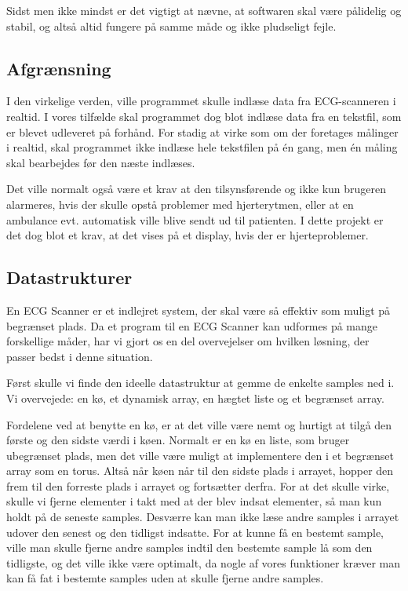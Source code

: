 \documentclass{article}
\begin{document}
Sidst men ikke mindst er det vigtigt at nævne, at softwaren skal være pålidelig og stabil, og altså altid fungere på samme måde og ikke pludseligt fejle.

\subsection{Afgrænsning}
I den virkelige verden, ville programmet skulle indlæse data fra ECG-scanneren i realtid. I vores tilfælde skal programmet dog blot indlæse data fra en tekstfil, som er blevet udleveret på forhånd. For stadig at virke som om der foretages målinger i realtid, skal programmet ikke indlæse hele tekstfilen på én gang, men én måling skal bearbejdes før den næste indlæses.

Det ville normalt også være et krav at den tilsynsførende og ikke kun brugeren alarmeres, hvis der skulle opstå problemer med hjerterytmen, eller at en ambulance evt. automatisk ville blive sendt ud til patienten. I dette projekt er det dog blot et krav, at det vises på et display, hvis der er hjerteproblemer.

\subsection{Datastrukturer}
En ECG Scanner er et indlejret system, der skal være så effektiv som muligt på begrænset plads. Da et program til en ECG Scanner kan udformes på mange forskellige måder, har vi gjort os en del overvejelser om hvilken løsning, der passer bedst i denne situation.

Først skulle vi finde den ideelle datastruktur at gemme de enkelte samples ned i. Vi overvejede: en kø, et dynamisk array, en hægtet liste og et begrænset array.

Fordelene ved at benytte en kø, er at det ville være nemt og hurtigt at tilgå den første og den sidste værdi i køen. Normalt er en kø en liste, som bruger ubegrænset plads, men det ville være muligt at implementere den i et begrænset array som en torus. Altså når køen når til den sidste plads i arrayet, hopper den frem til den forreste plads i arrayet og fortsætter derfra. For at det skulle virke, skulle vi fjerne elementer i takt med at der blev indsat elementer, så man kun holdt på de seneste samples. Desværre kan man ikke læse andre samples i arrayet udover den senest og den tidligst indsatte. For at kunne få en bestemt sample, ville man skulle fjerne andre samples indtil den bestemte sample lå som den tidligste, og det ville ikke være optimalt, da nogle af vores funktioner kræver man kan få fat i bestemte samples uden at skulle fjerne andre samples.
\end{document}
